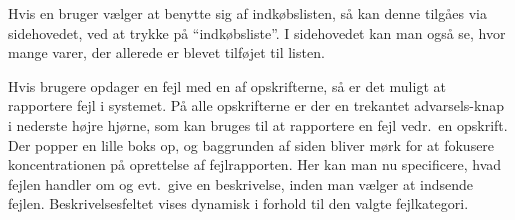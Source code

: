 Hvis en bruger vælger at benytte sig af indkøbslisten, så kan denne tilgåes via sidehovedet, ved at trykke på ``indkøbsliste''. I sidehovedet kan man også se, hvor mange varer, der allerede er blevet tilføjet til listen.

Hvis brugere opdager en fejl med en af opskrifterne, så er det muligt at rapportere fejl i systemet. På alle opskrifterne er der en trekantet advarsels-knap i nederste højre hjørne, som kan bruges til at rapportere en fejl vedr.\ en opskrift. Der popper en lille boks op, og baggrunden af siden bliver mørk for at fokusere koncentrationen på oprettelse af fejlrapporten. Her kan man nu specificere, hvad fejlen handler om og evt.\ give en beskrivelse, inden man vælger at indsende fejlen. Beskrivelsesfeltet vises dynamisk i forhold til den valgte fejlkategori.

